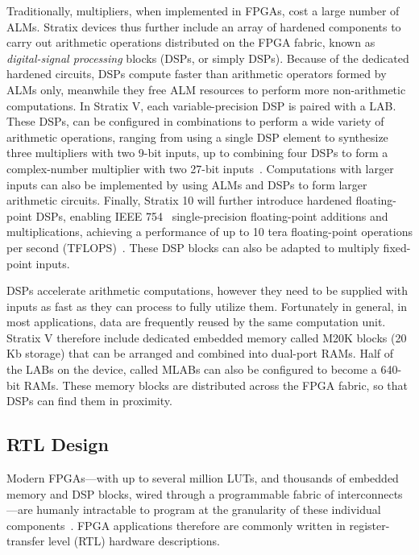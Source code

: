 Traditionally, multipliers, when implemented in FPGAs, cost a large number of
ALMs.  Stratix devices thus further include an array of hardened components
to carry out arithmetic operations distributed on the FPGA fabric, known as
\emph{digital-signal processing} blocks (DSPs, or simply DSPs).  Because
of the dedicated hardened circuits, DSPs compute faster than arithmetic
operators formed by ALMs only, meanwhile they free ALM resources to perform
more non-arithmetic computations.  In Stratix V, each variable-precision
DSP is paired with a LAB\@.  These DSPs, can be configured in
combinations to perform a wide variety of arithmetic operations, ranging from
using a single DSP element to synthesize three multipliers with two 9-bit
inputs, up to combining four DSPs to form a complex-number multiplier
with two 27-bit inputs~\cite{stratix5}.  Computations with larger inputs can
also be implemented by using ALMs and DSPs to form larger arithmetic
circuits.  Finally, Stratix 10 will further introduce hardened floating-point
DSPs, enabling IEEE 754~\cite{ieee754} single-precision floating-point
additions and multiplications, achieving a performance of up to 10 tera
floating-point operations per second (TFLOPS)~\cite{stratix10fp}.  These DSP
blocks can also be adapted to multiply fixed-point inputs.

DSPs accelerate arithmetic computations, however they need to be supplied
with inputs as fast as they can process to fully utilize them.  Fortunately
in general, in most applications, data are frequently reused by the same
computation unit.  Stratix V therefore include dedicated embedded memory called
M20K blocks (20 Kb storage) that can be arranged and combined into dual-port
RAMs.  Half of the LABs on the device, called MLABs can also be configured to
become a 640-bit RAMs.  These memory blocks are distributed across the FPGA
fabric, so that DSPs can find them in proximity.


\subsection{RTL Design}
\label{bg:sub:rtl_design}

Modern FPGAs---with up to several million LUTs, and thousands of
embedded memory and DSP blocks, wired through a programmable fabric of
interconnects---are humanly intractable to program at the granularity of these
individual components~\cite{kapre08}.  FPGA applications therefore are commonly
written in register-transfer level (RTL) hardware descriptions.
